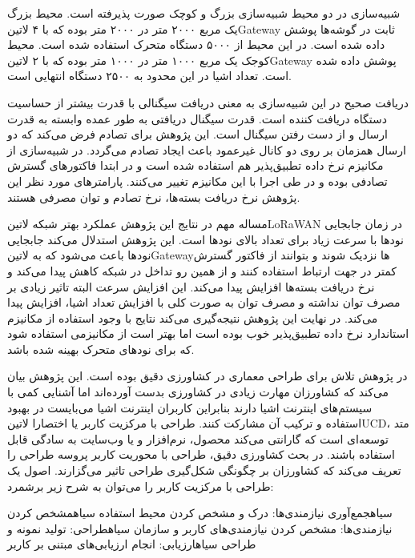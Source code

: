 شبیه‌سازی در دو محیط شبیه‌سازی بزرگ و کوچک صورت پذیرفته است. محیط بزرگ یک مربع ۲۰۰۰ متر در ۲۰۰۰ متر بوده که با ۴ ‌لاتین{Gateway}
ثابت در گوشه‌ها پوشش داده شده است. در این محیط از ۵۰۰۰ دستگاه متحرک استفاده شده است.
محیط کوجک یک مربع ۱۰۰۰ متر در ۱۰۰۰ متر بوده که با ۲ ‌لاتین{Gateway} پوشش داده شده است.
تعداد اشیا در این محدود به ۲۵۰۰ دستگاه انتهایی است.

دریافت صحیح در این شبیه‌سازی به معنی دریافت سیگنالی با قدرت بیشتر از حساسیت دستگاه دریافت کننده است.
قدرت سیگنال دریافتی به طور عمده وابسته به قدرت ارسال و از دست رفتن سیگنال است.
این پژوهش برای تصادم فرض می‌کند که دو ارسال همزمان بر روی دو کانال غیرعمود باعث ایجاد تصادم می‌گردد.
در شبیه‌سازی از مکانیزم نرخ داده تطبیق‌پذیر هم استفاده شده است و در ابتدا فاکتورهای گسترش تصادفی بوده و در طی اجرا با این مکانیزم
تغییر می‌کنند. پارامترهای مورد نظر این پژوهش نرخ دریافت بسته‌ها، نرخ تصادم و توان مصرفی هستند.

مساله مهم در نتایج این پژوهش عملکرد بهتر شبکه ‌لاتین{LoRaWAN} در زمان جابجایی نودها با سرعت زیاد برای تعداد بالای نودها است.
این پژوهش استدلال می‌کند جابجایی نودها باعث می‌شود که به ‌لاتین{Gateway}ها نزدیک شوند و بتوانند از فاکتور گسترش
کمتر در جهت ارتباط استفاده کنند و از همین رو تداخل در شبکه کاهش پیدا می‌کند و نرخ دریافت بسته‌ها افزایش پیدا می‌کند.
این افزایش سرعت البته تاثیر زیادی بر مصرف توان نداشته و مصرف توان به صورت کلی با افزایش تعداد اشیا، افزایش پیدا می‌کند.
در نهایت این پژوهش نتیجه‌گیری می‌کند نتایج با وجود استفاده از مکانیزم استاندارد نرخ داده تطبیق‌پذیر خوب بوده است اما
بهتر است از مکانیزمی استفاده شود که برای نودهای متحرک بهینه شده باشد.


در پژوهش  تلاش برای طراحی معماری در کشاورزی دقیق بوده است. این پژوهش بیان می‌کند که کشاورزان مهارت زیادی در کشاورزی بدست آورده‌اند اما آشنایی کمی با سیستم‌های اینترنت اشیا دارند
بنابراین کاربران اینترنت اشیا می‌بایست در بهبود استفاده و ترکیب آن مشارکت کنند. طراحی با مرکزیت کاربر یا اختصارا ‌لاتین{UCD}، متد توسعه‌ای است که گارانتی می‌کند محصول، نرم‌افزار و یا وب‌سایت به سادگی قابل استفاده باشند.
در بحث کشاورزی دقیق، طراحی با محوریت کاربر پروسه طراحی را تعریف می‌کند که کشاورزان بر چگونگی شکل‌گیری طراحی تاثیر می‌گزارند. اصول یک طراحی با مرکزیت کاربر را می‌توان به شرح زیر برشمرد:

 ‌سیاه{جمع‌آوری نیازمندی‌ها}: درک و مشخص کردن محیط استفاده
 ‌سیاه{مشخص کردن نیازمندی‌ها}: مشخص کردن نیازمندی‌های کاربر و سازمان
 ‌سیاه{طراحی}: تولید نمونه و طراحی
 ‌سیاه{ارزیابی}: انجام ارزیابی‌های مبتنی بر کاربر

